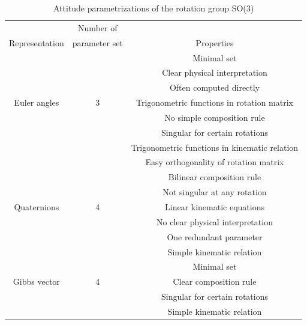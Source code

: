 \begin{table}
\caption{Attitude parametrizations of the rotation group SO(3) \cite{bak1999spacecraft}}
\label{arm:attRepSelection}
\begin{center}
 \begin{tabular}{||c || c | c ||}
 \hline
 &Number of  &  \\ [0.5ex] 
Representation &parameter set & Properties \\ [0.5ex] 
 \hline\hline
& & Minimal set\\ 
& & Clear physical interpretation\\ 
& & Often computed directly\\ 
 Euler angles   & 3 & Trigonometric functions in rotation matrix \\ 
& & No simple composition rule \\ 
& & Singular for certain rotations \\ 
& & Trigonometric functions in kinematic relation \\ 
 \hline
& & Easy orthogonality of rotation matrix\\ 
& & Bilinear composition rule\\ 
& & Not singular at any rotation\\ 
Quaternions   & 4 & Linear kinematic equations \\ 
& & No clear physical interpretation \\ 
& &One redundant parameter \\ 
& & Simple kinematic relation \\ 
 \hline
& & Minimal set\\ 
Gibbs vector   & 4 & Clear composition rule\\ 
& & Singular for certain rotations \\ 
& & Simple kinematic relation \\[1ex] 
 \hline
\end{tabular}
\end{center}
\end{table}



